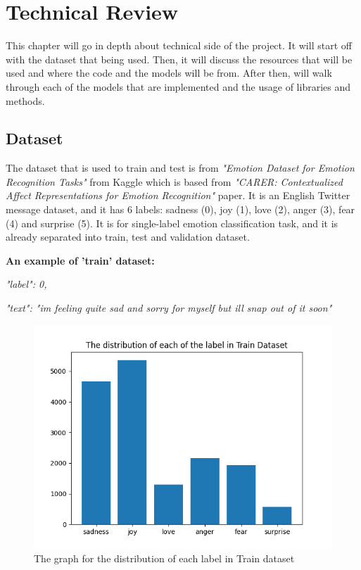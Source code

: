 
\chapter{Technical Review}

This chapter will go in depth about technical side of the project. It will start off with the dataset that being used. Then, it will discuss the resources that will be used and where the code and the models will be from. After then, will walk through each of the models that are implemented and the usage of libraries and methods.

\section{Dataset}
The dataset that is used to train and test is from \textit{"Emotion Dataset for Emotion Recognition Tasks"} \cite{Pandey_2021} from Kaggle which is based from \textit{"CARER: Contextualized Affect Representations for Emotion Recognition"} \cite{saravia-etal-2018-carer} paper. It is an English Twitter message dataset, and it has 6 labels: sadness (0), joy (1), love (2), anger (3), fear (4) and surprise (5). It is for single-label emotion classification task, and it is already separated into train, test and validation dataset. 

\textbf{An example of 'train' dataset:} 

\emph{"label": 0,}

\textit{"text": "im feeling quite sad and sorry for myself but ill snap out of it soon" }

\begin{figure}[h!]
    \centerline{\includegraphics[scale=0.5]{Figures/dataset_distribution.png}}
    \caption{The graph for the distribution of each label in Train dataset}
    \label{fig:dataset}
\end{figure}

